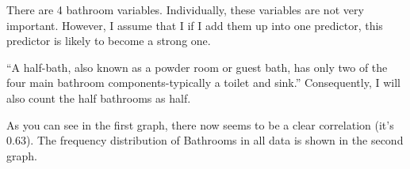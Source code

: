 \documentclass[]{article}
\newenvironment{Shaded}{\begin{snugshade}}{\end{snugshade}}
\newcommand{\KeywordTok}[1]{\textcolor[rgb]{0.13,0.29,0.53}{\textbf{#1}}}
\newcommand{\DataTypeTok}[1]{\textcolor[rgb]{0.13,0.29,0.53}{#1}}
\newcommand{\DecValTok}[1]{\textcolor[rgb]{0.00,0.00,0.81}{#1}}
\newcommand{\FloatTok}[1]{\textcolor[rgb]{0.00,0.00,0.81}{#1}}
\newcommand{\StringTok}[1]{\textcolor[rgb]{0.31,0.60,0.02}{#1}}
\newcommand{\OtherTok}[1]{\textcolor[rgb]{0.56,0.35,0.01}{#1}}
\newcommand{\OperatorTok}[1]{\textcolor[rgb]{0.81,0.36,0.00}{\textbf{#1}}}
\newcommand{\NormalTok}[1]{#1}
\begin{document}
There are 4 bathroom variables. Individually, these variables are not
very important. However, I assume that I if I add them up into one
predictor, this predictor is likely to become a strong one.

``A half-bath, also known as a powder room or guest bath, has only two
of the four main bathroom components-typically a toilet and sink.''
Consequently, I will also count the half bathrooms as half.

\begin{Shaded}
\end{Shaded}

As you can see in the first graph, there now seems to be a clear
correlation (it's 0.63). The frequency distribution of Bathrooms in all
data is shown in the second graph.

\begin{Shaded}
\end{Shaded}
\end{document}
